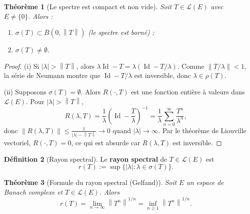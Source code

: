 \documentclass[a4paper,12pt]{book}
\DeclareMathOperator{\Id}{Id}
\newcommand{\norm}[1]{\left\| #1 \right\|}
\newcommand{\abs}[1]{\left| #1 \right|}
\theoremstyle{definition}
\newtheorem{definition}{Définition}[chapter]
\theoremstyle{plain}
\newtheorem{theoreme}[definition]{Théorème}
\theoremstyle{remark}
\begin{document}
\begin{theoreme}[Le spectre est compact et non vide]\label{thm:spectre-compact}
Soit $T \in \mathcal{L}(E)$ avec $E \neq \{0\}$. Alors :
\begin{enumerate}[label=(\roman*)]
    \item $\sigma(T) \subset \overline{B}(0, \norm{T})$ (le spectre est borné) ;
    \item $\sigma(T) \neq \emptyset$.
\end{enumerate}
\end{theoreme}

\begin{proof}
(i) Si $\abs{\lambda} > \norm{T}$, alors $\lambda\Id - T = \lambda(\Id - T/\lambda)$.
Comme $\norm{T/\lambda} < 1$, la série de Neumann montre que $\Id - T/\lambda$ est
inversible, donc $\lambda \in \rho(T)$.

(ii) Supposons $\sigma(T) = \emptyset$. Alors $R(\cdot, T)$ est une fonction entière
à valeurs dans $\mathcal{L}(E)$. Pour $\abs{\lambda} > \norm{T}$,
\[
    R(\lambda, T) = \frac{1}{\lambda}\left(\Id - \frac{T}{\lambda}\right)^{-1}
    = \frac{1}{\lambda}\sum_{n=0}^{\infty} \frac{T^n}{\lambda^n},
\]
donc $\norm{R(\lambda,T)} \leq \frac{1}{\abs{\lambda} - \norm{T}} \to 0$ quand
$\abs{\lambda} \to \infty$. Par le théorème de Liouville
vectoriel, $R(\cdot,T) = 0$, ce qui est absurde car $R(\lambda,T)$ est inversible.
\end{proof}

\begin{definition}[Rayon spectral]\label{def:rayon-spectral}
Le \textbf{rayon spectral} de $T \in \mathcal{L}(E)$ est
\[
    r(T) := \sup\{\abs{\lambda} : \lambda \in \sigma(T)\}.
\]
\end{definition}

\begin{theoreme}[Formule du rayon spectral (Gelfand)]\label{thm:rayon-spectral}
Soit $E$ un espace de Banach complexe et $T \in \mathcal{L}(E)$. Alors
\[
    r(T) = \lim_{n \to \infty} \norm{T^n}^{1/n} = \inf_{n \geq 1} \norm{T^n}^{1/n}.
\]
\end{theoreme}
\end{document}
